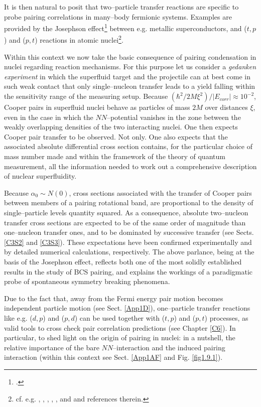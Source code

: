 It is then natural to posit that two--particle transfer reactions are specific to probe pairing correlations in many--body fermionic systems. Examples are provided by the Josephson effect\footnote{\cite{Josephson:62}.} between e.g. metallic superconductors, and ($t,p$) and ($p,t$) reactions in atomic nuclei\footnote{cf. e.g. \cite{Yoshida:62}, \cite{Broglia:73}, \cite{Bayman:71}, \cite{Glendenning:65}, \cite{Bohr:64}, \cite{Hansen:12} and \cite{Potel:13} and references therein.}.

Within this context we now take the basic consequence of pairing condensation in nuclei regarding reaction mechanisms. For this purpose let us consider a \textit{gedanken experiment} in which the superfluid target and the projectile can at best come in such weak contact that only  single--nucleon transfer leads to a yield falling within the sensitivity range of the measuring setup. Because $\left(\hbar^2/2M\xi^2\right)/|E_{corr}|\approx10^{-2}$, Cooper pairs in superfluid nuclei behave as particles of mass $2M$
 over distances $\xi$, even in the case in which the $NN$--potential vanishes in the zone between the weakly overlapping densities of the two interacting nuclei. One then expects Cooper pair transfer to be observed. Not only. One also expects that the associated absolute differential cross section contains, for the particular choice of mass number made and within the framework of the theory of quantum measurement, all the information needed to work out a comprehensive description of nuclear superfluidity.
 
 Because $\alpha_0\sim N(0)$, cross sections associated with the transfer of Cooper pairs between members of a pairing rotational band, are proportional to the density of single--particle levels quantity squared. As a consequence, absolute two--nucleon transfer cross sections are expected to be of the same order of magnitude than one--nucleon transfer ones, and to be dominated by successive transfer (see Sects. \ref{C3S2} and \ref{C3S3}). These expectations heve been confirmed experimentally and by detailed numerical calculations, respectively.
 The above parlance, being at the basis of the Josephson effect, reflects both one of the most solidly established results in the study of BCS pairing, and explains the workings of a paradigmatic probe of spontaneous symmetry breaking phenomena.
 
 
 
Due to the fact that, away from the Fermi energy pair  motion becomes independent particle motion (see Sect. \ref{App1D}), one--particle transfer reactions like e.g. ($d,p$) and ($p,d$) can be used together with ($t,p$) and ($p,t$) processes, as  valid tools to cross check pair correlation predictions (see Chapter \ref{C6}). In particular, to shed light on the origin of pairing in nuclei: in a nutshell, the relative importance of the bare $NN$--interaction and the induced pairing interaction (within this context see Sect. \ref{App1AF} and Fig. \ref{fig1.9.1}).

